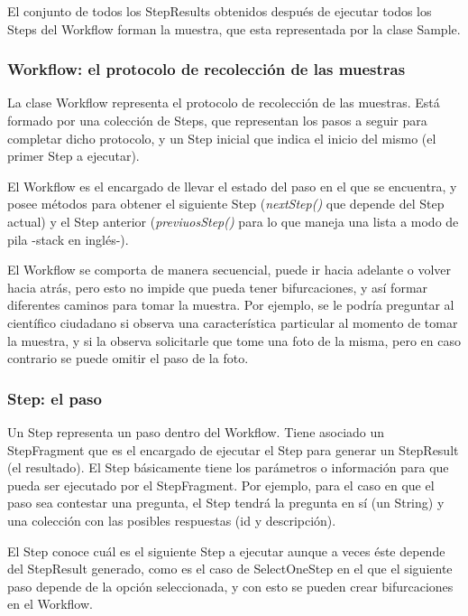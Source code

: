 El conjunto de todos los StepResults obtenidos después de ejecutar todos los Steps del Workflow forman la muestra, que esta representada por la clase Sample.


\subsubsection{Workflow: el protocolo de recolección de las muestras}
La clase Workflow representa el protocolo de recolección de las muestras. Está formado por una colección de Steps, que representan los pasos a seguir para completar dicho protocolo, y un Step inicial que indica el inicio del mismo (el primer Step a ejecutar).

El Workflow es el encargado de llevar el estado del paso en el que se encuentra, y posee métodos para obtener el siguiente Step (\textit{nextStep()}  que depende del Step actual) y el Step anterior (\textit{previuosStep()}  para lo que maneja una lista a modo de pila -stack en inglés-).

El Workflow se comporta de manera secuencial, puede ir hacia adelante o volver hacia atrás, pero esto no impide que pueda tener bifurcaciones, y así formar diferentes caminos para tomar la muestra. Por ejemplo, se le podría preguntar al científico ciudadano si observa una característica particular al momento de tomar la muestra, y si la observa solicitarle que tome una foto de la misma, pero en caso contrario se puede omitir el paso de la foto.

\clearpage
\subsubsection{Step: el paso}
Un Step representa un paso dentro del Workflow. Tiene asociado un StepFragment que es el encargado de ejecutar el Step para generar un StepResult (el resultado). El Step básicamente tiene los parámetros o información para que pueda ser ejecutado por el StepFragment.
Por ejemplo, para el caso en que el paso sea contestar una pregunta, el Step tendrá la pregunta en sí (un String) y una colección con las posibles respuestas (id y descripción).

El Step conoce cuál es el siguiente Step a ejecutar aunque a veces éste depende del StepResult generado, como es el caso de SelectOneStep en el que el siguiente paso depende de la opción seleccionada, y con esto se pueden crear bifurcaciones en el Workflow.


